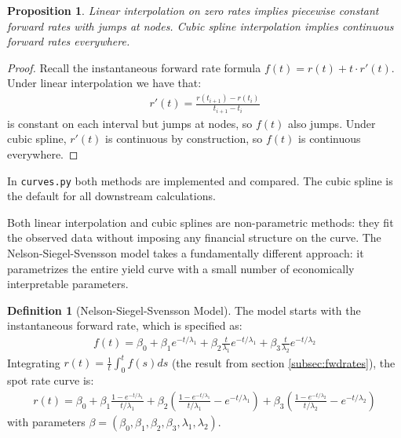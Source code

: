 \documentclass{article}
\theoremstyle{definition}  %
\newtheorem{definition}{Definition}[section]
\theoremstyle{plain}  %
\newtheorem{proposition}{Proposition}[section]
\numberwithin{definition}{section}
\numberwithin{proposition}{section}
\numberwithin{theorem}{section}
\numberwithin{equation}{section}
\begin{document}
\begin{proposition}
    Linear interpolation on zero rates implies piecewise constant forward rates with jumps at nodes. Cubic spline interpolation implies continuous forward rates everywhere.
\end{proposition}

\begin{proof}
    Recall the instantaneous forward rate formula $f(t) = r(t) + t \cdot r'(t)$. Under linear interpolation we have that:
    \begin{align*}
        r'(t) = \frac{r(t_{i + 1}) - r(t_{i})}{t_{i + 1} - t_{i}}
    \end{align*}
    is constant on each interval but jumps at nodes, so $f(t)$ also jumps. Under cubic spline, $r'(t)$ is continuous by construction, so $f(t)$ is continuous everywhere.
\end{proof}

In \texttt{curves.py} both methods are implemented and compared. The cubic spline is the default for all downstream calculations.

Both linear interpolation and cubic splines are non-parametric methods: they fit the observed data without imposing any financial structure on the curve. The Nelson-Siegel-Svensson model takes a fundamentally different approach: it parametrizes the entire yield curve with a small number of economically interpretable parameters.

\begin{definition}[Nelson-Siegel-Svensson Model]
    The model starts with the instantaneous forward rate, which is specified as:
    \begin{align*}
        f(t) = \beta_{0} + \beta_{1} e^{-t/\lambda_{1}} + \beta_{2} \frac{t}{\lambda_{1}} e^{-t/\lambda_{1}} + \beta_{3} \frac{t}{\lambda_{2}} e^{-t/\lambda_{2}}
    \end{align*}
    Integrating $r(t) = \frac{1}{t} \int_{0}^{t} f(s) ds$ (the result from section \ref{subsec:fwdrates}), the spot rate curve is:
    \begin{align*}
        \boxed{
        r(t) = \beta_{0} + \beta_{1} \frac{1 - e^{-t/\lambda_{1}}}{t/\lambda_{1}} + \beta_{2} \left(\frac{1 - e^{-t/\lambda_{1}}}{t/\lambda_{1}} - e^{-t/\lambda_{1}}\right) + \beta_{3} \left(\frac{1 - e^{-t/\lambda_{2}}}{t/\lambda_{2}} - e^{-t/\lambda_{2}} \right)
        }
    \end{align*}
    with parameters $\beta = (\beta_{0}, \beta_{1}, \beta_{2}, \beta_{3}, \lambda_{1}, \lambda_{2})$.
\end{definition}
\end{document}
